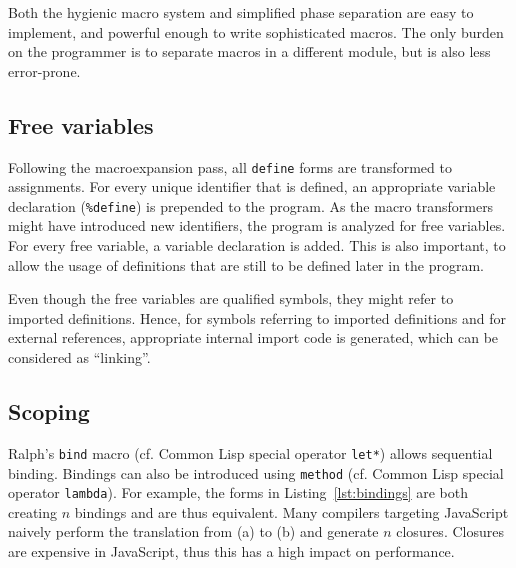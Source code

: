 \documentclass{acm_proc_article-sp}
\begin{document}
Both the hygienic macro system and simplified phase separation are
easy to implement, and powerful enough to write sophisticated macros.
The only burden on the programmer is to separate macros in a different
module, but is also less error-prone.

\subsection{Free variables}

Following the macroexpansion pass, all \texttt{define} forms are
transformed to assignments. For every unique identifier that is
defined, an appropriate variable declaration (\texttt{\%define})
is prepended to the program. As the macro transformers might have
introduced new identifiers, the program is analyzed for free
variables. For every free variable, a variable declaration is added.
This is also important, to allow the usage of definitions that
are still to be defined later in the program.

Even though the free variables are qualified symbols, they might refer
to imported definitions. Hence, for symbols referring to imported
definitions and for external references, appropriate internal import
code is generated, which can be considered as ``linking''.

\subsection{Scoping}

Ralph's \texttt{bind} macro (cf. Common Lisp special operator
\texttt{let*}) allows sequential binding. Bindings can also be
introduced using \texttt{method} (cf. Common Lisp special operator
\texttt{lambda}). For example, the forms in Listing~\ref{lst:bindings}
are both creating $n$ bindings and are thus equivalent. Many compilers
targeting JavaScript naively perform the translation from (a) to (b)
and generate $n$ closures. Closures are expensive in JavaScript,
thus this has a high impact on performance.
\end{document}
